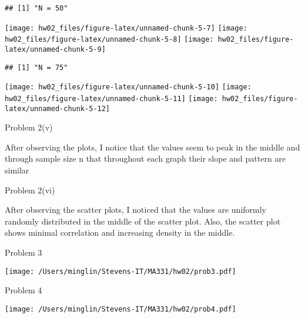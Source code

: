 \documentclass[
]{article}
\begin{document}
\begin{verbatim}
## [1] "N = 50"
\end{verbatim}

\texttt{[image: hw02\_files/figure-latex/unnamed-chunk-5-7]}
\texttt{[image: hw02\_files/figure-latex/unnamed-chunk-5-8]}
\texttt{[image: hw02\_files/figure-latex/unnamed-chunk-5-9]}

\begin{verbatim}
## [1] "N = 75"
\end{verbatim}

\texttt{[image: hw02\_files/figure-latex/unnamed-chunk-5-10]}
\texttt{[image: hw02\_files/figure-latex/unnamed-chunk-5-11]}
\texttt{[image: hw02\_files/figure-latex/unnamed-chunk-5-12]}

Problem 2(v)

After observing the plots, I notice that the values seem to peak in the
middle and through sample size n that throughout each graph their slope
and pattern are similar

Problem 2(vi)

After observing the scatter plots, I noticed that the values are
uniformly randomly distributed in the middle of the scatter plot. Also,
the scatter plot shows minimal correlation and increasing density in the
middle.

Problem 3

\texttt{[image: /Users/minglin/Stevens-IT/MA331/hw02/prob3.pdf]}

Problem 4

\texttt{[image: /Users/minglin/Stevens-IT/MA331/hw02/prob4.pdf]}
\end{document}
